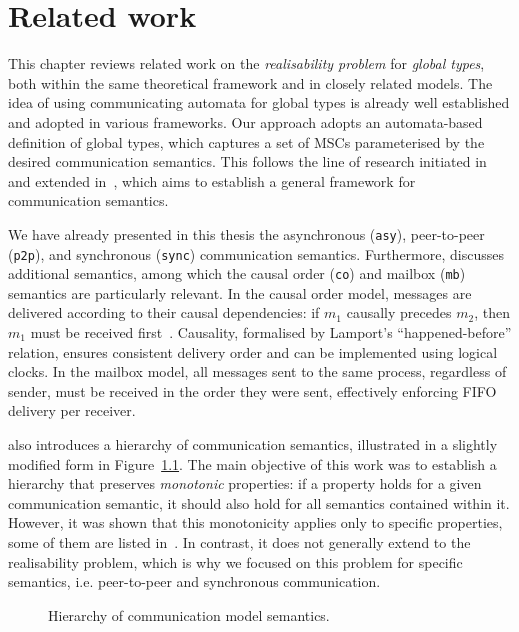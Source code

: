 \chapter{Related work}\label{sec:rel}
This chapter reviews related work on the \emph{realisability problem} 
for \emph{global types}, both within the same theoretical framework 
and in closely related models.  
The idea of using communicating automata for global types is already 
well established and adopted in various frameworks. Our approach 
adopts an automata-based definition of global types, which captures a 
set of MSCs parameterised by the desired communication semantics.  
This follows the line of research initiated in~\cite{di2023partial} 
and extended in~\cite{di2025realisability}, which aims to establish a 
general framework for communication semantics.  

We have already presented in this thesis the asynchronous 
(\verb|asy|), peer-to-peer (\verb|p2p|), and synchronous 
(\verb|sync|) communication semantics.  
Furthermore, \cite{di2023partial} discusses additional semantics, 
among which the causal order (\verb|co|) and mailbox (\verb|mb|) 
semantics are particularly relevant.
In the causal order model, messages are delivered according 
to their causal dependencies: if $m_1$ causally precedes $m_2$, then 
$m_1$ must be received first~\cite{lamport2019time}.  
Causality, formalised by Lamport’s ``happened-before'' relation, ensures 
consistent delivery order and can be implemented using logical clocks.  
In the mailbox model, all messages sent to the same process, 
regardless of sender, must be received in the order they were sent, 
effectively enforcing FIFO delivery per receiver.  

\cite{di2023partial} also introduces a hierarchy of communication 
semantics, illustrated in a slightly modified form in 
Figure~\ref{fig:coms}.  
The main objective of this work was to establish a hierarchy that 
preserves \emph{monotonic} properties: if a property holds for a given 
communication semantic, it should also hold for all semantics 
contained within it.  
However, it was shown that this monotonicity applies only to specific 
properties, some of them are listed in~\cite{di2023partial}.  
In contrast, it does not generally extend to the realisability 
problem, which is why we focused on this problem for specific semantics, 
i.e. peer-to-peer and synchronous communication.

\bigskip

\begin{figure}[!ht]
\centering
{}
\caption{Hierarchy of communication model semantics.}
\label{fig:coms}
\end{figure}

